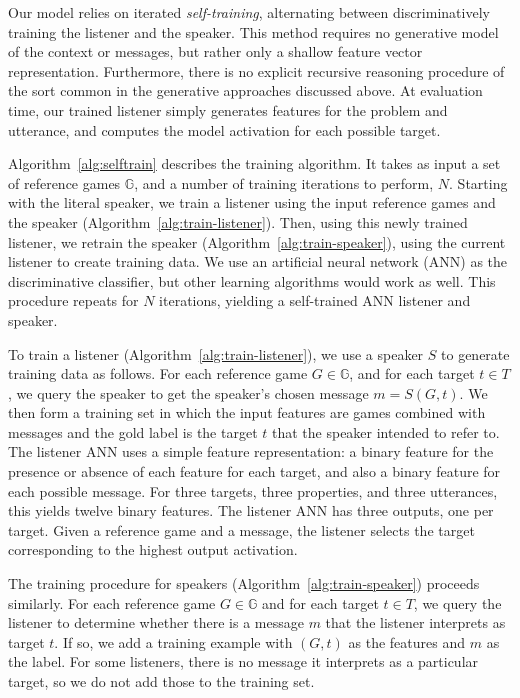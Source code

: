 Our model relies on iterated \emph{self-training}, alternating
between discriminatively training the listener and the speaker.  This
method requires no generative model of the context or messages, but
rather only a shallow feature vector representation.  Furthermore,
there is no explicit recursive reasoning procedure of the sort common
in the generative approaches discussed above.  At evaluation time, our
trained listener simply generates features for the problem and
utterance, and computes the model activation for each possible target.

Algorithm~\ref{alg:selftrain} describes the training algorithm. It
takes as input a set of reference games $\mathbb{G}$, and a number of
training iterations to perform, $N$.  Starting with the literal
speaker, we train a listener using the input reference games and the
speaker (Algorithm~\ref{alg:train-listener}). Then, using this newly
trained listener, we retrain the speaker
(Algorithm~\ref{alg:train-speaker}), using the current listener to
create training data.  We use an artificial neural network (ANN) as
the discriminative classifier, but other learning algorithms would
work as well.  This procedure repeats for $N$ iterations, yielding a
self-trained ANN listener and speaker.

To train a listener (Algorithm~\ref{alg:train-listener}), we use a
speaker $S$ to generate training data as follows.  For each reference
game $G \in \mathbb{G}$, and for each target $t \in T$, we query the
speaker to get the speaker's chosen message $m = S(G,t)$.  We then
form a training set in which the input features are games combined
with messages and the gold label is the target $t$ that the speaker
intended to refer to. The listener ANN uses a simple feature
representation: a binary feature for the presence or absence of each
feature for each target, and also a binary feature for each possible
message. For three targets, three properties, and three utterances,
this yields twelve binary features. The listener ANN has three
outputs, one per target. Given a reference game and a message, the
listener selects the target corresponding to the highest output
activation.

The training procedure for speakers
(Algorithm~\ref{alg:train-speaker}) proceeds similarly. For each
reference game $G \in \mathbb{G}$ and for each target $t \in T$, we
query the listener to determine whether there is a message $m$ that
the listener interprets as target $t$.  If so, we add a training
example with $(G, t)$ as the features and $m$ as the label.  For some
listeners, there is no message it interprets as a particular target,
so we do not add those to the training set.

